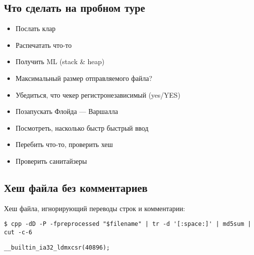 \subsection{Что сделать на пробном туре}
\begin{itemize}
\item Послать клар
\item Распечатать что-то
\item Получить ML (stack \& heap)
\item Максимальный размер отправляемого файла?
\item Убедиться, что чекер регистронезависимый (yes/YES)
\item Позапускать Флойда --- Варшалла
\item Посмотреть, насколько быстр быстрый ввод
\item Перебить что-то, проверить хеш
\item Проверить санитайзеры
\end{itemize}
\subsection{Хеш файла без комментариев}
Хеш файла, игнорирующий переводы строк и комментарии:
\begin{lstlisting}
$ cpp -dD -P -fpreprocessed "$filename" | tr -d '[:space:]' | md5sum | cut -c-6
\end{lstlisting}
\begin{verbatim}__builtin_ia32_ldmxcsr(40896);\end{verbatim}